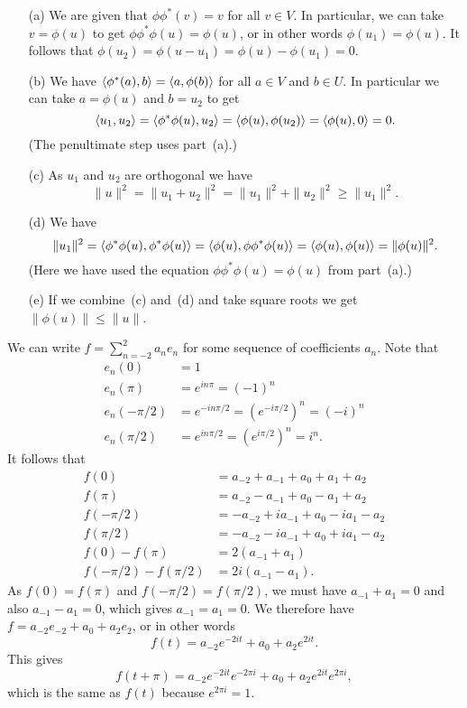  \begin{itemize}
  \item[(a)] We are given that $\phi\phi^*(v)=v$ for all
   $v\in V$.  In particular, we can take $v=\phi(u)$ to get
   $\phi\phi^*\phi(u)=\phi(u)$, or in other words
   $\phi(u_1)=\phi(u)$.  It follows that
   $\phi(u_2)=\phi(u-u_1)=\phi(u)-\phi(u_1)=0$.
  \item[(b)] We have $\langle \phi^*(a),b\rangle=\langle a,\phi(b)\rangle$ for
   all $a\in V$ and $b\in U$.  In particular we can take
   $a=\phi(u)$ and $b=u_2$ to get
   \[ \langle u_1,u_2\rangle = \langle \phi^*\phi(u),u_2\rangle =
      \langle \phi(u),\phi(u_2)\rangle =
      \langle \phi(u),0\rangle = 0.
   \]
   (The penultimate step uses part~(a).)
  \item[(c)] As $u_1$ and $u_2$ are orthogonal we have
   \[ \|u\|^2 = \|u_1+u_2\|^2 = \|u_1\|^2 + \|u_2\|^2 \geq
       \|u_1\|^2.
   \]
  \item[(d)] We have
   \[ \|u_1\|^2 = \langle \phi^*\phi(u),\phi^*\phi(u)\rangle =
       \langle \phi(u),\phi\phi^*\phi(u)\rangle = \langle \phi(u),\phi(u)\rangle
       = \|\phi(u)\|^2.
   \]
   (Here we have used the equation
   $\phi\phi^*\phi(u)=\phi(u)$ from part~(a).)
  \item[(e)] If we combine~(c) and~(d) and take square roots
   we get $\|\phi(u)\|\leq\|u\|$.
 \end{itemize}
\EndDeferredSolution

 We can write $f=\sum_{n=-2}^2a_ne_n$ for some sequence of
 coefficients $a_n$.  Note that
 \begin{align*}
  e_n(0) &= 1 \\
  e_n(\pi) &= e^{in\pi} = (-1)^n \\
  e_n(-\pi/2) &= e^{-in\pi/2} = (e^{-i\pi/2})^n = (-i)^n \\
  e_n(\pi/2) &= e^{in\pi/2} = (e^{i\pi/2})^n = i^n.
 \end{align*}
 It follows that
 \begin{align*}
  f(0)      &= a_{-2} + a_{-1} + a_0 + a_1 + a_2 \\
  f(\pi)    &= a_{-2} - a_{-1} + a_0 - a_1 + a_2 \\
  f(-\pi/2) &= -a_{-2} + ia_{-1} + a_0 - ia_1 - a_2 \\
  f(\pi/2)  &= -a_{-2} - ia_{-1} + a_0 + ia_1 - a_2 \\
  f(0)-f(\pi) &= 2(a_{-1}+a_1) \\
  f(-\pi/2)-f(\pi/2) &= 2i(a_{-1}-a_1).
 \end{align*}
 As $f(0)=f(\pi)$ and $f(-\pi/2)=f(\pi/2)$, we must have
 $a_{-1}+a_1=0$ and also $a_{-1}-a_1=0$, which gives $a_{-1}=a_1=0$.
 We therefore have $f=a_{-2}e_{-2}+a_0+a_2e_2$, or in other words
 \[ f(t) = a_{-2} e^{-2it} + a_0 + a_2 e^{2it}. \]
 This gives
 \[ f(t+\pi) =
  a_{-2} e^{-2it}e^{-2\pi i} + a_0 + a_2 e^{2it} e^{2\pi i},
 \]
 which is the same as $f(t)$ because $e^{2\pi i}=1$.
\EndDeferredSolution

